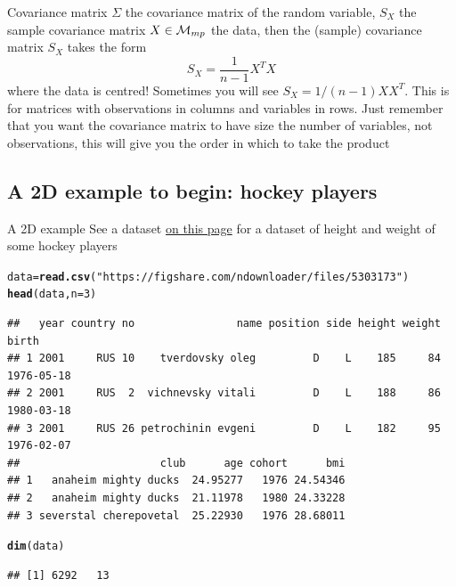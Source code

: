 \documentclass[aspectratio=169]{beamer}\usepackage[]{graphicx}\usepackage[]{xcolor}
\makeatletter
\newcommand{\hlnum}[1]{\textcolor[rgb]{0.686,0.059,0.569}{#1}}%
\newcommand{\hlstr}[1]{\textcolor[rgb]{0.192,0.494,0.8}{#1}}%
\newcommand{\hlstd}[1]{\textcolor[rgb]{0.345,0.345,0.345}{#1}}%
\newcommand{\hlkwb}[1]{\textcolor[rgb]{0.69,0.353,0.396}{#1}}%
\newcommand{\hlkwc}[1]{\textcolor[rgb]{0.333,0.667,0.333}{#1}}%
\newcommand{\hlkwd}[1]{\textcolor[rgb]{0.737,0.353,0.396}{\textbf{#1}}}%
\newenvironment{kframe}{%
 \def\at@end@of@kframe{}%
 \ifinner\ifhmode%
  \def\at@end@of@kframe{\end{minipage}}%
  \begin{minipage}{\columnwidth}%
 \fi\fi%
 \def\FrameCommand##1{\hskip\@totalleftmargin \hskip-\fboxsep
 \colorbox{shadecolor}{##1}\hskip-\fboxsep
     \hskip-\linewidth \hskip-\@totalleftmargin \hskip\columnwidth}%
 \MakeFramed {\advance\hsize-\width
   \@totalleftmargin\z@ \linewidth\hsize
   \@setminipage}}%
 {\par\unskip\endMakeFramed%
 \at@end@of@kframe}
\newenvironment{knitrout}{}{} %
\makeatother
\begin{document}
\begin{frame}{Covariance matrix}
$\Sigma$ the covariance matrix of the random variable, $S_X$ the sample covariance matrix
\vfill
$X\in\mathcal{M}_{mp}$ the data, then the (sample) covariance matrix $S_X$ takes the form
\[
S_X = \frac{1}{n-1}X^TX
\]
where the data is centred!
\vfill
Sometimes you will see $S_X=1/(n-1)XX^T$. This is for matrices with observations in columns and variables in rows. Just remember that you want the covariance matrix to have size the number of variables, not observations, this will give you the order in which to take the product
\end{frame}

\subsection{A 2D example to begin: hockey players}

\begin{frame}[fragile]{A 2D example}
See a dataset \href{https://opendata.stackexchange.com/questions/7793/age-weight-and-height-dataset}{on this page} for a dataset of height and weight of some hockey players
\vfill
\begin{knitrout}
\color{fgcolor}\begin{kframe}
\begin{alltt}
\hlstd{data} \hlkwb{=} \hlkwd{read.csv}\hlstd{(}\hlstr{"https://figshare.com/ndownloader/files/5303173"}\hlstd{)}
\hlkwd{head}\hlstd{(data,} \hlkwc{n}\hlstd{=}\hlnum{3}\hlstd{)}
\end{alltt}
\begin{verbatim}
##   year country no                name position side height weight      birth
## 1 2001     RUS 10    tverdovsky oleg         D    L    185     84 1976-05-18
## 2 2001     RUS  2  vichnevsky vitali         D    L    188     86 1980-03-18
## 3 2001     RUS 26 petrochinin evgeni         D    L    182     95 1976-02-07
##                      club      age cohort      bmi
## 1   anaheim mighty ducks  24.95277   1976 24.54346
## 2   anaheim mighty ducks  21.11978   1980 24.33228
## 3 severstal cherepovetal  25.22930   1976 28.68011
\end{verbatim}
\begin{alltt}
\hlkwd{dim}\hlstd{(data)}
\end{alltt}
\begin{verbatim}
## [1] 6292   13
\end{verbatim}
\end{kframe}
\end{knitrout}
\end{frame}
\end{document}
